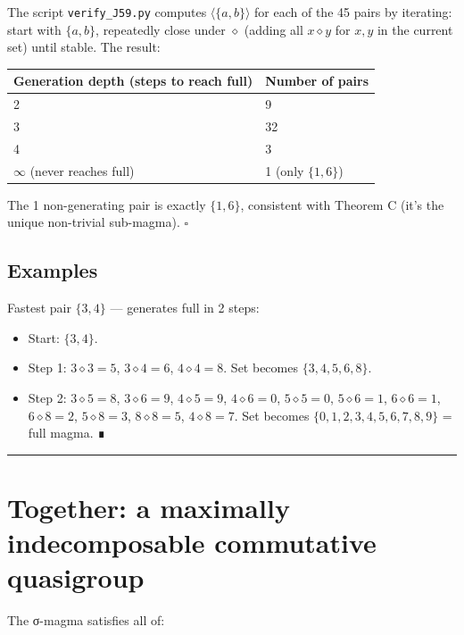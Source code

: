 \documentclass[11pt,reqno]{amsart}
\theoremstyle{plain}
\theoremstyle{definition}
\begin{document}
The script \texttt{verify_J59.py} computes $\langle \{a, b\} \rangle$ for each of the 45 pairs by iterating: start with $\{a, b\}$, repeatedly close under $\diamond$ (adding all $x \diamond y$ for $x, y$ in the current set) until stable. The result:

\begin{center}
\begin{tabular}{ll}
\toprule
Generation depth (steps to reach full) & Number of pairs \\
\midrule
2 & 9 \\
3 & 32 \\
4 & 3 \\
$\infty$ (never reaches full) & 1 (only $\{1, 6\}$) \\
\bottomrule
\end{tabular}
\end{center}

The 1 non-generating pair is exactly $\{1, 6\}$, consistent with Theorem C (it's the unique non-trivial sub-magma). $\square$

\subsection{Examples}

Fastest pair $\{3, 4\}$ --- generates full in 2 steps:
\begin{itemize}
\item Start: $\{3, 4\}$.
\item Step 1: $3 \diamond 3 = 5$, $3 \diamond 4 = 6$, $4 \diamond 4 = 8$. Set becomes $\{3, 4, 5, 6, 8\}$.
\item Step 2: $3 \diamond 5 = 8$, $3 \diamond 6 = 9$, $4 \diamond 5 = 9$, $4 \diamond 6 = 0$, $5 \diamond 5 = 0$, $5 \diamond 6 = 1$, $6 \diamond 6 = 1$, $6 \diamond 8 = 2$, $5 \diamond 8 = 3$, $8 \diamond 8 = 5$, $4 \diamond 8 = 7$. Set becomes $\{0, 1, 2, 3, 4, 5, 6, 7, 8, 9\}$ = full magma. ∎
\end{itemize}

\medskip\hrule\medskip

\section{Together: a maximally indecomposable commutative quasigroup}

The σ-magma satisfies all of:
\end{document}
